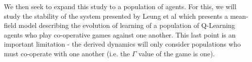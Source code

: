 \documentclass[.../main.tex]{subfiles}
\begin{document}
    We then seek to expand this study to a population of agents. For this, we will study the
    stability of the system presented by Leung et al \cite{Hu2019} which presents a mean-field model
    describing the evolution of learning of a population of Q-Learning agents who play co-operative
    games against one another. This last point is an important limitation - the derived dynamics
    will only consider populations who must co-operate with one another (i.e. the $\Gamma$ value of
    the game is one). 
\end{document}
